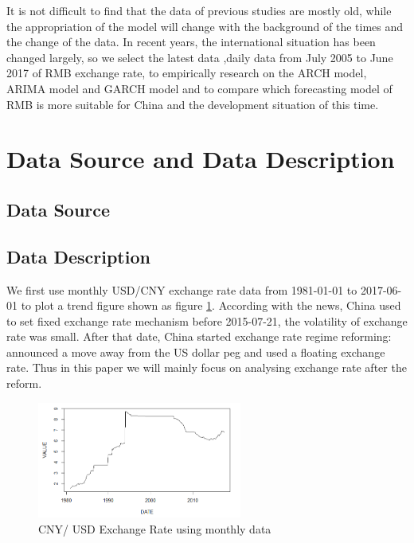 \documentclass[12pt, a4paper, titlepage]{article}
\begin{document}
It is not difficult to find that the data of previous studies are mostly old, while the appropriation of the model will change with the background of the times and the change of the data. In recent years, the international situation has been changed largely, so we select the latest data ,daily data from July 2005 to June 2017 of RMB exchange rate, to empirically research on the ARCH model, ARIMA model and GARCH model and to compare which forecasting model of RMB is more suitable for China and the development situation of this time.

\section{Data Source and Data Description}
\subsection{Data Source}

\subsection{Data Description}
We first use monthly USD/CNY exchange rate data from 1981-01-01 to 2017-06-01 to plot a trend figure shown as figure \ref{monthly}. According with the news, China used to set fixed exchange rate mechanism before 2015-07-21, the volatility of exchange rate was small. After that date, China started exchange rate regime reforming: announced a move away from the US dollar peg and used a floating exchange rate. Thus in this paper we will mainly focus on analysing exchange rate after the reform.\\ 
\begin{figure}
\begin{center}
\caption{CNY/ USD Exchange Rate using monthly data}\label{monthly}
\includegraphics[width=0.6\textwidth]{monthly.png} 
\end{center}
\end{figure}
\end{document}
